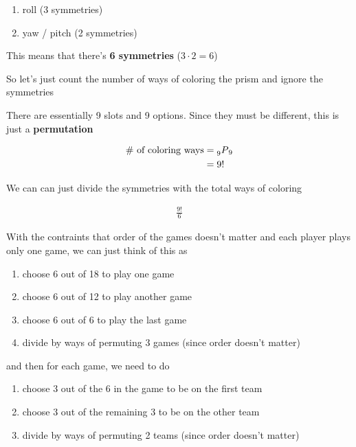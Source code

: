 \documentclass[../Main.tex]{subfiles}
\begin{document}
\begin{alphabet}
{        \begin{enumerate}
            \item roll (3 symmetries)
            \item yaw / pitch (2 symmetries)
        \end{enumerate}

        This means that there's \textbf{6 symmetries} ($3 \cdot 2 = 6$)

        So let's just count the number of ways of coloring the prism and ignore the symmetries

        There are essentially 9 slots and 9 options. Since they must be different, this is just a \textbf{permutation}

        \begin{align*}
            \text{\# of coloring ways} &= \prescript{}{9}{P}_9 \\
            &= 9!
        \end{align*}

        We can can just divide the symmetries with the total ways of coloring

        \begin{align*}
            \boxed{\frac{9!}{6}}
        \end{align*}
    }

    \item
    {
        With the contraints that order of the games doesn't matter and each player plays only one game,
        we can just think of this as

        \begin{enumerate}
            \item choose 6 out of 18 to play one game
            \item choose 6 out of 12 to play another game
            \item choose 6 out of 6 to play the last game
            \item divide by ways of permuting 3 games (since order doesn't matter)
        \end{enumerate}

        and then for each game, we need to do

        \begin{enumerate}
            \item choose 3 out of the 6 in the game to be on the first team
            \item choose 3 out of the remaining 3 to be on the other team
            \item divide by ways of permuting 2 teams (since order doesn't matter)
        \end{enumerate}

}
\end{alphabet}
\end{document}
